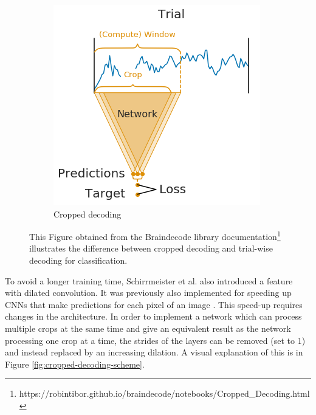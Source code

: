 \begin{figure}[!htpb]
\begin{subfigure}[b]{0.55\textwidth}
   \includegraphics[width=0.9\linewidth]{img/ch3/trialwise-explanation2.png} 
   \caption{Cropped decoding}
   \label{fig:trial-wise-decoding-cropped}
\end{subfigure}
\caption[Trial-wise vs. cropped decoding]{This Figure obtained from the Braindecode library documentation\footnote{https://robintibor.github.io/braindecode/notebooks/Cropped\_Decoding.html} illustrates the difference between cropped decoding and trial-wise decoding for classification.}
\label{fig:trial-wise-decoding} 
\end{figure}

To avoid a longer training time, Schirrmeister et al.\cite{schirrmeister-deep-2017} also introduced a feature with dilated convolution.
It was previously also implemented for speeding up CNNs that make predictions for each pixel of an image \cite{}. 
This speed-up requires changes in the architecture.
In order to implement a network which can process multiple crops at the same time and give an equivalent result as the network processing one crop at a time, the strides of the layers can be removed (set to 1) and instead replaced by an increasing dilation.
A visual explanation of this is in Figure \ref{fig:cropped-decoding-scheme}.

